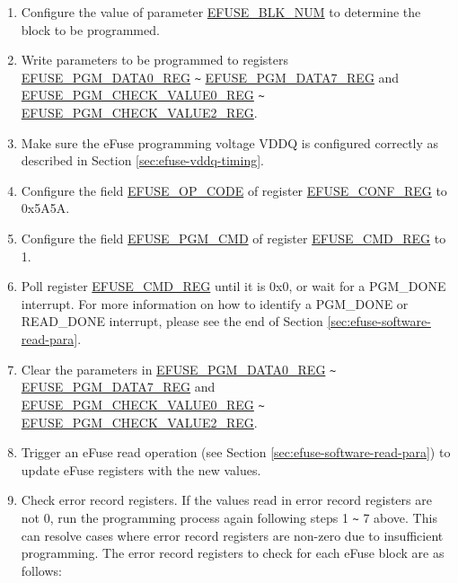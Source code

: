 \documentclass[main\_\_EN.tex]{subfiles}
\begin{document}
\begin{enumerate}
\item Configure the value of parameter \hyperref[fielddesc:EFUSEBLKNUM]{EFUSE\_BLK\_NUM} to determine the block to be programmed.

\item Write parameters to be programmed to registers \hyperref[regdesc:EFUSEPGMDATANREG]{EFUSE\_PGM\_DATA0\_REG} \verb+~+ \hyperref[regdesc:EFUSEPGMDATANREG]{EFUSE\_PGM\_DATA7\_REG} and  \hyperref[regdesc:EFUSEPGMCHECKVALUENREG]{EFUSE\_PGM\_CHECK\_VALUE0\_REG} \verb+~+ \hyperref[regdesc:EFUSEPGMCHECKVALUENREG]{EFUSE\_PGM\_CHECK\_VALUE2\_REG}. 

\item Make sure the eFuse programming voltage VDDQ is configured correctly as described in Section \ref{sec:efuse-vddq-timing}.

\item Configure the field \hyperref[fielddesc:EFUSEOPCODE]{EFUSE\_OP\_CODE} of register \hyperref[regdesc:EFUSECONFREG]{EFUSE\_CONF\_REG} to 0x5A5A.

\item Configure the field \hyperref[fielddesc:EFUSEPGMCMD]{EFUSE\_PGM\_CMD} of register \hyperref[regdesc:EFUSECMDREG]{EFUSE\_CMD\_REG} to 1.

\item Poll register \hyperref[regdesc:EFUSECMDREG]{EFUSE\_CMD\_REG} until it is 0x0, or wait for a PGM\_DONE interrupt. For more information on how to identify a PGM\_DONE or READ\_DONE interrupt, please see the end of Section \ref{sec:efuse-software-read-para}.

\item Clear the parameters in \hyperref[regdesc:EFUSEPGMDATANREG]{EFUSE\_PGM\_DATA0\_REG} \verb+~+ \hyperref[regdesc:EFUSEPGMDATANREG]{EFUSE\_PGM\_DATA7\_REG} and \\ \hyperref[regdesc:EFUSEPGMCHECKVALUENREG]{EFUSE\_PGM\_CHECK\_VALUE0\_REG} \verb+~+ \hyperref[regdesc:EFUSEPGMCHECKVALUENREG]{EFUSE\_PGM\_CHECK\_VALUE2\_REG}.

\item Trigger an eFuse read operation (see Section \ref{sec:efuse-software-read-para}) to update eFuse registers with the new values.
\item Check error record registers. If the values read in error record registers are not 0, run the programming process again following steps 1 \verb+~+ 7 above. This can resolve cases where error record registers are non-zero due to insufficient programming. The error record registers to check for each eFuse block are as follows:



\end{enumerate}
\end{document}
